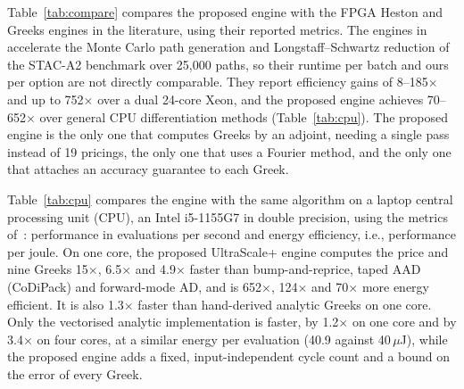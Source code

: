 \documentclass[conference]{IEEEtran}
\begin{document}
Table~\ref{tab:compare} compares the proposed engine with the FPGA Heston and Greeks engines in the
literature, using their reported metrics. The engines in~\cite{klai,klaih2rc} accelerate the
Monte Carlo path generation and Longstaff--Schwartz reduction of the STAC-A2 benchmark over
25,000 paths, so their runtime per batch and ours per option are not directly comparable. They
report efficiency gains of 8--185$\times$ and up to 752$\times$ over a dual 24-core Xeon, and the
proposed engine achieves 70--652$\times$ over general CPU differentiation methods (Table~\ref{tab:cpu}). The proposed
engine is the only one that computes Greeks by an adjoint, needing a single pass instead of 19
pricings, the only one that uses a Fourier method, and the only one that attaches an accuracy
guarantee to each Greek.

Table~\ref{tab:cpu} compares the engine with the same algorithm on a laptop central processing
unit (CPU), an Intel i5-1155G7 in double precision, using the metrics of~\cite{klai,klaih2rc}:
performance in evaluations per second and energy efficiency, i.e., performance per joule. On one
core, the proposed UltraScale+ engine computes the price and nine Greeks 15$\times$, 6.5$\times$
and 4.9$\times$ faster than bump-and-reprice, taped AAD (CoDiPack) and forward-mode
AD, and is 652$\times$, 124$\times$ and 70$\times$ more energy efficient. It is also 1.3$\times$
faster than hand-derived analytic Greeks on one core. Only the vectorised analytic implementation
is faster, by 1.2$\times$ on one core and by 3.4$\times$ on four cores, at a similar energy per
evaluation (40.9 against 40\,$\mu$J), while the proposed engine adds a fixed, input-independent cycle
count and a bound on the error of every Greek.
\end{document}
